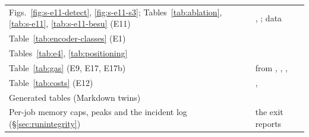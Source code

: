 \documentclass[10pt]{article}
\begin{document}
{\begin{longtable}{@{}L{5.6cm}L{11.2cm}@{}}
Figs.~\ref{fig:s-e11-detect}, \ref{fig:s-e11-s3}; Tables~\ref{tab:ablation}, \ref{tab:s-e11}, \ref{tab:s-e11-besu} (E11) & , ; data  \\
Table~\ref{tab:encoder-classes} (E1) &  \\
Tables~\ref{tab:e4}, \ref{tab:positioning} &  \\
Table~\ref{tab:gas} (E9, E17, E17b) &  from , , ,  \\
Table~\ref{tab:costs} (E12) & ,  \\
Generated tables (Markdown twins) &  \\
Per-job memory caps, peaks and the incident log (\S\ref{sec:runintegrity}) & the exit reports  \\
\end{longtable}}


{\small

}
\end{document}
